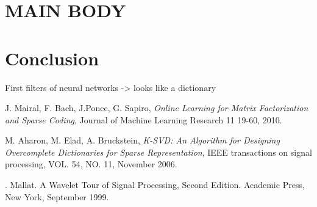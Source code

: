 \documentclass[a4paper,11pt]{article}
\begin{document}
\section{MAIN BODY}

\section{Conclusion}
First filters of neural networks -> looks like a dictionary



\begin{thebibliography}{9}
  J. Mairal, F. Bach, J.Ponce, G. Sapiro,
  \emph{Online Learning for Matrix Factorization and Sparse Coding},
  Journal of Machine Learning Research 11 19-60, 2010.

  M. Aharon, M. Elad, A. Bruckstein,
  \emph{K-SVD: An Algorithm for Designing Overcomplete Dictionaries for Sparse Representation},
  IEEE transactions on signal processing, VOL. 54, NO. 11, November 2006.
 
. Mallat. A Wavelet Tour of Signal Processing, Second Edition. Academic Press, New York,
September 1999.
\end{thebibliography}
\end{document}
